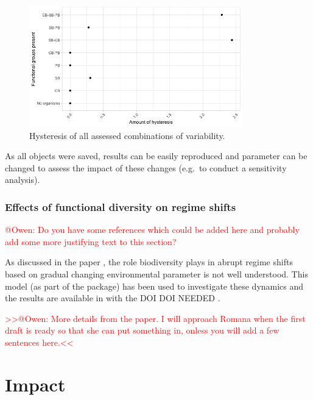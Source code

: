 \documentclass[]{elsarticle} %
\begin{document}
\begin{figure}

{\centering \includegraphics[width=350px]{figures/user_guide_hysteresis} 

}

\caption{Hysteresis of all assessed combinations of variability.}\label{fig:user_guide_hysteresis}
\end{figure}

As all objects were saved, results can be easily reproduced and
parameter can be changed to assess the impact of these changes (e.g.~to
conduct a sensitivity analysis).

\hypertarget{effects-of-functional-diversity-on-regime-shifts}{%
\subsubsection{Effects of functional diversity on regime
shifts}\label{effects-of-functional-diversity-on-regime-shifts}}

\textcolor{red}{@Owen: Do you have some references which could be added here and probably add some more justifying text to this section?}

As discussed in the paper \citep{REF_NEEDED}, the role biodiversity
plays in abrupt regime shifts based on gradual changing environmental
parameter is not well understood. This model (as part of the package)
has been used to investigate these dynamics and the results are
available in with the DOI DOI NEEDED \citet{REF_NEEDED}.

\textcolor{red}{{>>@Owen: More details from the paper. I will approach Romana when the first draft is ready so that she can put something in, onless you will add a few sentences here.<<}}

\hypertarget{impact}{%
\section{Impact}\label{impact}}
\end{document}
